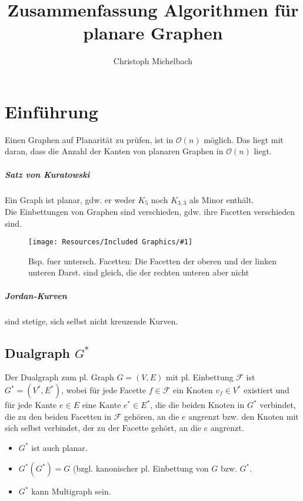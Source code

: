 \documentclass[a4paper,11pt]{report}
\title{Zusammenfassung Algorithmen für planare Graphen}
\author{Christoph Michelbach}
\newcommand{\fig}[2]{
    \begin{figure}[h]
        \begin{center}
            \texttt{[image: Resources/Included Graphics/\#1]}
            \caption{#1}
            \label{fig:#1}
        \end{center}
    \end{figure}
}
\begin{document}
\maketitle
\tableofcontents

\chapter{Einführung}
Einen Graphen auf Planarität zu prüfen, ist in $\mathcal{O}(n)$ möglich. Das liegt mit daran, dass die Anzahl der Kanten von planaren Graphen in $\mathcal{O}(n)$ liegt.\\

\paragraph{Satz von Kuratowski} Ein Graph ist planar, gdw. er weder $K_5$ noch $K_{3, 3}$ als Minor enthält.\\

Die Einbettungen von Graphen sind verschieden, gdw. ihre Facetten verschieden sind.
\fig{Bsp. fuer untersch. Facetten: Die Facetten der oberen und der linken unteren Darst. sind gleich, die der rechten unteren aber nicht}{.7}

\paragraph{Jordan-Kurven} sind stetige, sich selbst nicht kreuzende Kurven.\\


\section{Dualgraph $G^*$}
Der Dualgraph zum pl. Graph $G = (V, E)$ mit pl. Einbettung $\mathcal{F}$ ist $G^* = (V^*, E^*)$, wobei für jede Facette $f \in \mathcal{F}$ ein Knoten $v_f \in V^*$ existiert und für jede Kante $e \in E$ eine Kante $e^* \in E^*$, die die beiden Knoten in $G^*$ verbindet, die zu den beiden Facetten in $\mathcal{F}$ gehören, an die $e$ angrenzt bzw. den Knoten mit sich selbst verbindet, der zu der Facette gehört, an die $e$ angrenzt.\\

\begin{itemize}
    \item $G^*$ ist auch planar.
    \item $G^*(G^*) = G$ (bzgl. kanonischer pl. Einbettung von $G$ bzw. $G^*$.
    \item $G^*$ kann Multigraph sein.
\end{itemize}
\end{document}
